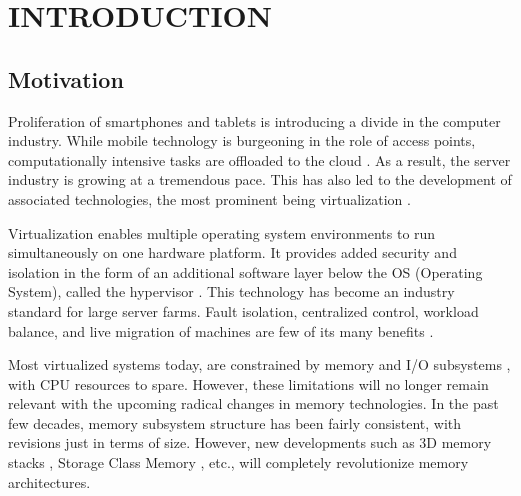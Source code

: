 %
%
%



\pagestyle{plain} %
\setcounter{page}{1}


\chapter{\uppercase {Introduction}}

\section{Motivation}
Proliferation of smartphones and tablets is introducing a divide in the computer industry. While mobile technology is burgeoning in the role of access points, computationally intensive tasks are offloaded to the cloud \cite{virt_benefits}. As a result, the server industry is growing at a tremendous pace. This has also led to the development of associated technologies, the most prominent being virtualization \cite{virt_back}.

Virtualization enables multiple operating system environments to run simultaneously on one hardware platform. It provides added security and isolation in the form of an additional software layer below the OS (Operating System), called the hypervisor \cite{virt_arch}. This technology has become an industry standard for large server farms. Fault isolation, centralized control, workload balance, and live migration of machines are few of its many benefits \cite{virt_back}.

Most virtualized systems today, are constrained by memory and I/O subsystems \cite{virt_io_bottleneck} \cite{virt_bottleneck} \cite{virt_io_bottleneck2}, with CPU resources to spare. However, these limitations will no longer remain relevant with the upcoming radical changes in memory technologies. In the past few decades, memory subsystem structure has been fairly consistent, with revisions just in terms of size. However, new developments such as 3D memory stacks \cite{mem_3d1} \cite{mem_3d2}, Storage Class Memory \cite{scm1} \cite{scm2}, etc., will completely revolutionize memory architectures.

